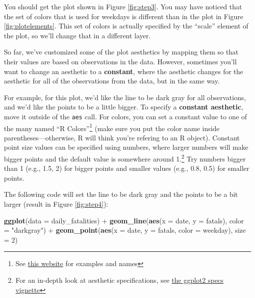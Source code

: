 \documentclass[]{tufte-book}
\newenvironment{Shaded}{}{}
\newcommand{\DataTypeTok}[1]{\textcolor[rgb]{0.56,0.13,0.00}{#1}}
\newcommand{\DecValTok}[1]{\textcolor[rgb]{0.25,0.63,0.44}{#1}}
\newcommand{\KeywordTok}[1]{\textcolor[rgb]{0.00,0.44,0.13}{\textbf{#1}}}
\newcommand{\NormalTok}[1]{#1}
\newcommand{\OperatorTok}[1]{\textcolor[rgb]{0.40,0.40,0.40}{#1}}
\newcommand{\StringTok}[1]{\textcolor[rgb]{0.25,0.44,0.63}{#1}}
\begin{document}
You should get the plot shown in Figure \ref{fig:step3}. You may have noticed that
the set of colors that is used for weekdays is different than in the plot in
Figure \ref{fig:plotelements}. This set of colors is actually specified by the
``scale'' element of the plot, so we'll change that in a different layer.

So far, we've customized some of the plot aesthetics by mapping them so that their
values are based on observations in the data. However, sometimes you'll want
to change an aesthetic to a \textbf{constant}, where the aesthetic changes for the
aesthetic for all of the observations from the data, but in the same way.

For example, for this plot, we'd like the line to be dark gray for all observations,
and we'd like the points to be a little bigger. To specify a \textbf{constant aesthetic},
move it outside of the \texttt{aes} call. For colors, you can set a constant value to
one of the many named ``R Colors''\footnote{See \href{http://www.stat.columbia.edu/~tzheng/files/Rcolor.pdf}{this website} for examples and names}
(make sure you put the color name inside parentheses---otherwise, R will think you're
refering to an R object). Constant point size values can be specified using numbers,
where larger numbers will make bigger points and the default value is somewhere
around 1.\footnote{For
  an in-depth look at aesthetic specifications, see
  \href{https://cran.r-project.org/web/packages/ggplot2/vignettes/ggplot2-specs.html}{the ggplot2 specs vignette}} Try numbers bigger than 1 (e.g., 1.5, 2) for bigger points and smaller
values (e.g., 0.8, 0.5) for smaller points.

The following code will set the line to be dark gray and the points to be a bit larger (result in Figure \ref{fig:step4}):

\begin{Shaded}
\begin{Highlighting}[]
\KeywordTok{ggplot}\NormalTok{(}\DataTypeTok{data =}\NormalTok{ daily_fatalities) }\OperatorTok{+}\StringTok{ }\KeywordTok{geom_line}\NormalTok{(}\KeywordTok{aes}\NormalTok{(}\DataTypeTok{x =}\NormalTok{ date, }
    \DataTypeTok{y =}\NormalTok{ fatals), }\DataTypeTok{color =} \StringTok{"darkgray"}\NormalTok{) }\OperatorTok{+}\StringTok{ }\KeywordTok{geom_point}\NormalTok{(}\KeywordTok{aes}\NormalTok{(}\DataTypeTok{x =}\NormalTok{ date, }
    \DataTypeTok{y =}\NormalTok{ fatals, }\DataTypeTok{color =}\NormalTok{ weekday), }\DataTypeTok{size =} \DecValTok{2}\NormalTok{)}
\end{Highlighting}
\end{Shaded}
\end{document}
